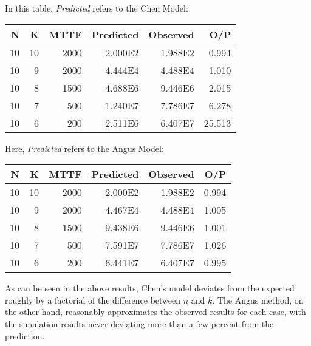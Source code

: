 \documentclass[XXX,endnotes]{usetex-v1}
\begin{document}
In this table, \emph{Predicted} refers to the Chen Model:

\begin{center}
  \begin{tabular}{ | r | r | r | r | r | r | }
    \hline
      N       & K        & MTTF     & Predicted    & Observed  & O/P         \\ \hline
      10      & 10       & 2000     & 2.000E2      & 1.988E2   & 0.994       \\ \hline
      10      & 9        & 2000     & 4.444E4      & 4.488E4   & 1.010       \\ \hline
      10      & 8        & 1500     & 4.688E6      & 9.446E6   & 2.015       \\ \hline
      10      & 7        & 500      & 1.240E7      & 7.786E7   & 6.278       \\ \hline
      10      & 6        & 200      & 2.511E6      & 6.407E7   & 25.513      \\ \hline
  \end{tabular}
\end{center}

Here, \emph{Predicted} refers to the Angus Model:

\begin{center}
  \begin{tabular}{ | r | r | r | r | r | r | }
    \hline
      N       & K        & MTTF     & Predicted    & Observed  & O/P         \\ \hline
      10      & 10       & 2000     & 2.000E2      & 1.988E2   & 0.994       \\ \hline
      10      & 9        & 2000     & 4.467E4      & 4.488E4   & 1.005       \\ \hline
      10      & 8        & 1500     & 9.438E6      & 9.446E6   & 1.001       \\ \hline
      10      & 7        & 500      & 7.591E7      & 7.786E7   & 1.026       \\ \hline
      10      & 6        & 200      & 6.441E7      & 6.407E7   & 0.995       \\ \hline
  \end{tabular}
\end{center}


As can be seen in the above results, Chen's model deviates from the expected roughly by a factorial of the difference between $n$ and $k$.  The Angus method, on the other hand, reasonably approximates the observed results for each case, with the simulation results never deviating more than a few percent from the prediction.
\end{document}
